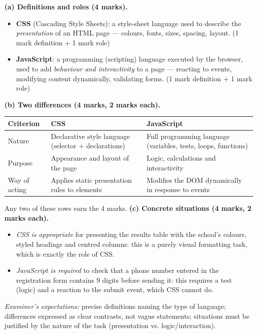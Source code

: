 \documentclass[11pt]{article}
\begin{document}
\begin{corrige}
\textbf{(a) Definitions and roles (4 marks).}
\begin{itemize}
\item \textbf{CSS} (Cascading Style Sheets): a style-sheet language used to describe the \emph{presentation} of an HTML page --- colours, fonts, sizes, spacing, layout. \hfill(1 mark definition + 1 mark role)
\item \textbf{JavaScript}: a programming (scripting) language executed by the browser, used to add \emph{behaviour and interactivity} to a page --- reacting to events, modifying content dynamically, validating forms. \hfill(1 mark definition + 1 mark role)
\end{itemize}
\textbf{(b) Two differences (4 marks, 2 marks each).}
\begin{center}
\begin{tabularx}{\linewidth}{|l|X|X|}\hline
\rowcolor{popblueL} \textbf{Criterion} & \textbf{CSS} & \textbf{JavaScript} \\ \hline
Nature & Declarative style language (selector + declarations) & Full programming language (variables, tests, loops, functions) \\ \hline
Purpose & Appearance and layout of the page & Logic, calculations and interactivity \\ \hline
Way of acting & Applies static presentation rules to elements & Modifies the DOM dynamically in response to events \\ \hline
\end{tabularx}
\end{center}
Any two of these rows earn the 4 marks.
\textbf{(c) Concrete situations (4 marks, 2 marks each).}
\begin{itemize}
\item \emph{CSS is appropriate} for presenting the results table with the school's colours, styled headings and centred columns: this is a purely visual formatting task, which is exactly the role of CSS.
\item \emph{JavaScript is required} to check that a phone number entered in the registration form contains 9 digits before sending it: this requires a test (logic) and a reaction to the submit event, which CSS cannot do.
\end{itemize}
\emph{Examiner's expectations:} precise definitions naming the type of language; differences expressed as clear contrasts, not vague statements; situations must be justified by the nature of the task (presentation vs. logic/interaction).
\end{corrige}
\end{document}
